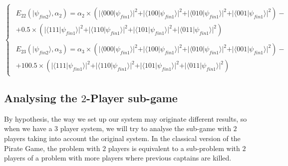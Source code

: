  \begin{equation}
\begin{cases}
\begin{split}
E_{22}(\vert\psi_{fin2}\rangle, \alpha_{2})=\alpha_{2}\times(\vert\langle000\vert\psi_{fin1}\rangle\vert^{2} + \vert\langle100\vert\psi_{fin1}\rangle\vert^{2}
+ \vert\langle010\vert\psi_{fin1}\rangle\vert^{2}
+ \vert\langle001\vert\psi_{fin1}\rangle\vert^{2}
 ) - \\
 + 0.5\times(\vert\langle111\vert\psi_{fin1}\rangle\vert^{2} + \vert\langle110\vert\psi_{fin1}\rangle\vert^{2}
+ \vert\langle101\vert\psi_{fin1}\rangle\vert^{2}
+ \vert\langle011\vert\psi_{fin1}\rangle\vert^{2}
 )
\end{split}
\\
\begin{split}
E_{23}(\vert\psi_{fin2}\rangle, \alpha_{3})=\alpha_{3}\times(\vert\langle000\vert\psi_{fin1}\rangle\vert^{2} + \vert\langle100\vert\psi_{fin1}\rangle\vert^{2}
+ \vert\langle010\vert\psi_{fin1}\rangle\vert^{2}
+ \vert\langle001\vert\psi_{fin1}\rangle\vert^{2}
 ) - \\
 + 100.5 \times(\vert\langle111\vert\psi_{fin1}\rangle\vert^{2} + \vert\langle110\vert\psi_{fin1}\rangle\vert^{2}
+ \vert\langle101\vert\psi_{fin1}\rangle\vert^{2}
+ \vert\langle011\vert\psi_{fin1}\rangle\vert^{2}
 )
\end{split}
\end{cases}
\label{eq:pirates_payoff3}
\end{equation}


\subsection{Analysing the $2$-Player sub-game}
\label{subsec:2_player_subgame_piratas_doidos}

By hypothesis, the way we set up our system may originate different results, so when we have a $3$ player system, we will try to analyse the sub-game with $2$ players taking into account the original system. In the classical version of the Pirate Game, the problem with $2$ players is equivalent to a sub-problem with $2$ players of a problem with more players where previous captains are killed. 

